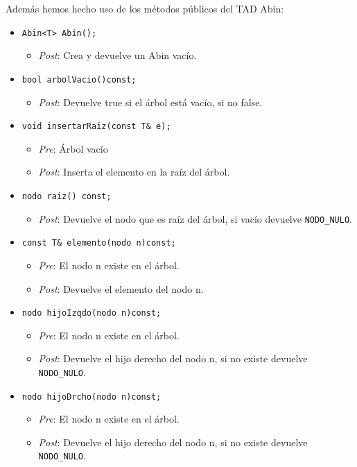 Además hemos hecho uso de los métodos públicos del TAD Abin:
\begin{itemize}

  \item \verb|Abin<T> Abin();|
  \begin{itemize}
    \item \textit{Post}: Crea y devuelve un Abin vacío.
  \end{itemize}
  \item \verb|bool arbolVacio()const;|
  \begin{itemize}
    \item \textit{Post}: Devuelve true si el árbol está vacío, si no false.
  \end{itemize}
  \item \verb|void insertarRaiz(const T& e);|
  \begin{itemize}
    \item \textit{Pre}: Árbol vacío
    \item \textit{Post}: Inserta el elemento en la raíz del árbol.
  \end{itemize}
  \item \verb|nodo raiz() const;|
  \begin{itemize}
    \item \textit{Post}: Devuelve el nodo que es raíz del árbol, si vacío devuelve \texttt{NODO\_NULO}.
  \end{itemize}
  \item \verb|const T& elemento(nodo n)const;|
  \begin{itemize}
    \item \textit{Pre}: El nodo n existe en el árbol.
    \item \textit{Post}: Devuelve el elemento del nodo n.
  \end{itemize}
  \item \verb|nodo hijoIzqdo(nodo n)const;|
  \begin{itemize}
    \item \textit{Pre}: El nodo n existe en el árbol.
    \item \textit{Post}: Devuelve el hijo derecho del nodo n, si no existe devuelve \texttt{NODO\_NULO}.
  \end{itemize}
  \item \verb|nodo hijoDrcho(nodo n)const;|
  \begin{itemize}
    \item \textit{Pre}: El nodo n existe en el árbol.
    \item \textit{Post}: Devuelve el hijo derecho del nodo n, si no existe devuelve \texttt{NODO\_NULO}.

\end{itemize}
\end{itemize}
